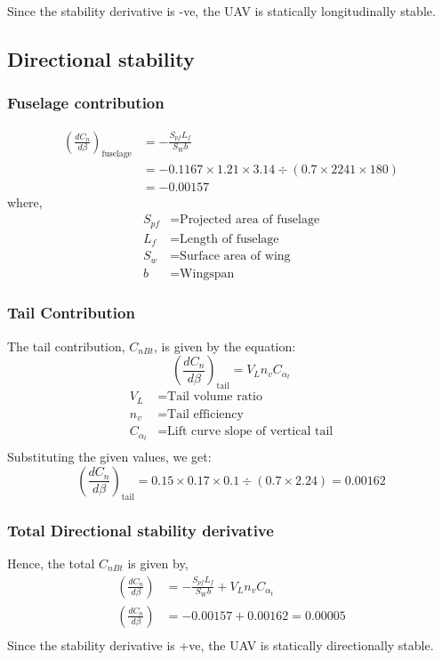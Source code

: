 \documentclass[12 pt]{article}
\begin{document}
{{Since the stability derivative is -ve, the UAV is statically longitudinally stable.

\subsection{Directional stability}
\subsubsection{ Fuselage contribution}
\begin{align*}
\left(\frac{dC_n}{d\beta}\right)_{\text{fuselage}} &= -\frac{S_{pf}L_{f}}{S_{W} b} \\
&= -0.1167 \times 1.21 \times 3.14 \div (0.7 \times 2241 \times 180) \\
&= -0.00157
\end{align*}
where,
\begin{align*}
S_{pf} & = \text{Projected area of fuselage} \\
L_{f} & = \text{Length of fuselage} \\
S_{w} & = \text{Surface area of wing} \\
b & = \text{Wingspan}
\end{align*}

\subsubsection{ Tail Contribution}
The tail contribution, \( C_{nBt} \), is given by the equation:
\[ \left(\frac{dC_n}{d\beta}\right)_{\text{tail}} = V_L n_v C_{\alpha_t} \]
\begin{align*}
V_L & = \text{Tail volume ratio} \\
n_v & = \text{Tail efficiency} \\
C_{\alpha_t} & = \text{Lift curve slope of vertical tail} \\
\end{align*}
Substituting the given values, we get:
\[ \left(\frac{dC_n}{d\beta}\right)_{\text{tail}} = 0.15 \times 0.17 \times 0.1 \div (0.7 \times 2.24) = 0.00162 \]
\subsubsection{ Total Directional stability derivative}
Hence, the total \( C_{nBt} \) is given by, \\
\begin{align*}
    \left(\frac{dC_n}{d\beta}\right) &= -\frac{S_{pf}L_{f}}{S_{W} b} + V_L n_v C_{\alpha_t} \ \\
    \left(\frac{dC_n}{d\beta}\right) &= - 0.00157 + 0.00162 = 0.00005 \\
\end{align*}
Since the stability derivative is +ve, the UAV is statically directionally stable.
\newpage
}}
\end{document}

